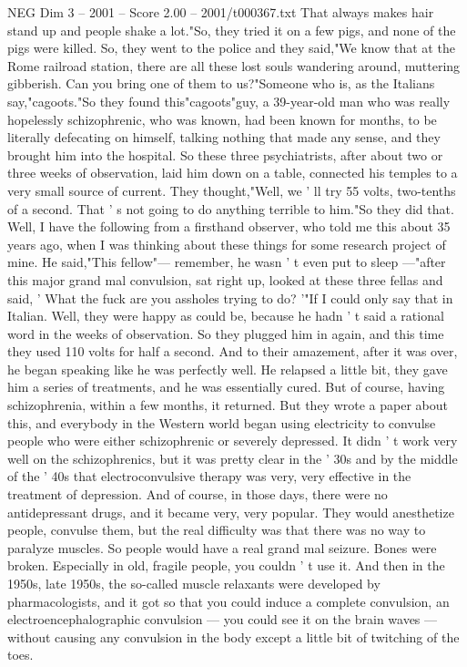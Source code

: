 \begin{textsample}{NEG Dim 3 – 2001 – Score 2.00 – 2001/t000367.txt}
That always makes hair stand up and people shake a lot."So, they tried it on a few pigs, and none of the pigs were killed.
So, they went to the police and they said,"We know that at the Rome railroad station, there are all these lost souls wandering around, muttering gibberish.
Can you bring one of them to us?"Someone who is, as the Italians say,"cagoots."So they found this"cagoots"guy, a 39-year-old man who was really hopelessly schizophrenic, who was known, had been known for months, to be literally defecating on himself, talking nothing that made any sense, and they brought him into the hospital.
So these three psychiatrists, after about two or three weeks of observation, laid him down on a table, connected his temples to a very small source of current.
They thought,"Well, we ' ll try 55 volts, two-tenths of a second.
That ' s not going to do anything terrible to him."So they did that.
Well, I have the following from a firsthand observer, who told me this about 35 years ago, when I was thinking about these things for some research project of mine.
He said,"This fellow"— remember, he wasn ' t even put to sleep —"after this major grand mal convulsion, sat right up, looked at these three fellas and said, ' What the fuck are you assholes trying to do? '"If I could only say that in Italian.
Well, they were happy as could be, because he hadn ' t said a rational word in the weeks of observation.
So they plugged him in again, and this time they used 110 volts for half a second.
And to their amazement, after it was over, he began speaking like he was perfectly well.
He relapsed a little bit, they gave him a series of treatments, and he was essentially cured.
But of course, having schizophrenia, within a few months, it returned.
But they wrote a paper about this, and everybody in the Western world began using electricity to convulse people who were either schizophrenic or severely depressed.
It didn ' t work very well on the schizophrenics, but it was pretty clear in the ' 30s and by the middle of the ' 40s that electroconvulsive therapy was very, very effective in the treatment of depression.
And of course, in those days, there were no antidepressant drugs, and it became very, very popular.
They would anesthetize people, convulse them, but the real difficulty was that there was no way to paralyze muscles.
So people would have a real grand mal seizure.
Bones were broken.
Especially in old, fragile people, you couldn ' t use it.
And then in the 1950s, late 1950s, the so-called muscle relaxants were developed by pharmacologists, and it got so that you could induce a complete convulsion, an electroencephalographic convulsion — you could see it on the brain waves — without causing any convulsion in the body except a little bit of twitching of the toes.

\end{textsample}
